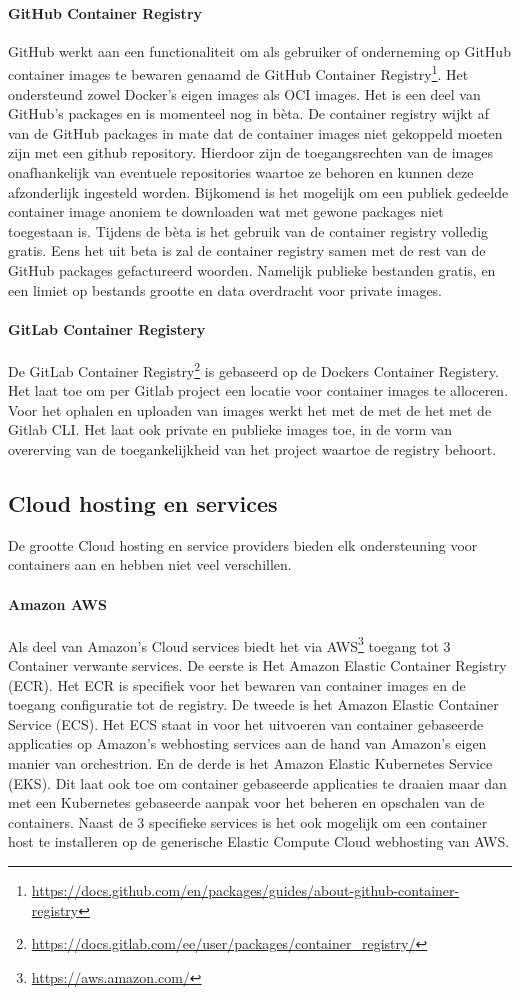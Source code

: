 \paragraph{GitHub Container Registry}
GitHub werkt aan een functionaliteit om als gebruiker of onderneming op GitHub container images te bewaren genaamd de  GitHub Container Registry\footnote{\url{https://docs.github.com/en/packages/guides/about-github-container-registry}}. Het ondersteund zowel Docker’s eigen images als OCI images. Het is een deel van GitHub’s packages en is momenteel nog in bèta. De container registry wijkt af van de GitHub packages in mate dat de container images niet gekoppeld moeten zijn met een github repository. Hierdoor zijn de toegangsrechten van de images onafhankelijk van eventuele repositories waartoe ze behoren en kunnen deze afzonderlijk ingesteld worden. Bijkomend is het mogelijk om een publiek gedeelde container image anoniem te downloaden wat met gewone packages niet toegestaan is. Tijdens de bèta is het gebruik van de container registry volledig gratis. Eens het uit beta is zal de container registry samen met de rest van de GitHub packages gefactureerd woorden. Namelijk publieke bestanden gratis, en een limiet op bestands grootte en data overdracht voor private images.
\paragraph{GitLab Container Registery}
De GitLab Container Registry\footnote{\url{https://docs.gitlab.com/ee/user/packages/container_registry/}} is gebaseerd op de Dockers Container Registery. Het laat toe om per Gitlab project een locatie voor container images te alloceren. Voor het ophalen en uploaden van images werkt het met de met de het met de Gitlab CLI. Het laat ook private en publieke images toe, in de vorm van overerving van de toegankelijkheid van het project waartoe de registry behoort. 


\subsection{Cloud hosting en services}
De grootte Cloud hosting en service providers bieden elk ondersteuning voor containers aan en hebben niet veel verschillen.
\paragraph{Amazon AWS}
Als deel van Amazon’s Cloud services biedt het via AWS\footnote{\url{https://aws.amazon.com/}} toegang tot 3 Container verwante services. De eerste is Het Amazon Elastic Container Registry (ECR). Het ECR is specifiek voor het bewaren van container images en de toegang configuratie tot de registry. De tweede is het Amazon Elastic Container Service (ECS). Het ECS staat in voor het uitvoeren van container gebaseerde applicaties op Amazon’s webhosting services aan de hand van Amazon’s eigen manier van orchestrion. En de derde is het Amazon Elastic Kubernetes Service (EKS). Dit laat ook toe om container gebaseerde applicaties te draaien maar dan met een Kubernetes gebaseerde aanpak voor het beheren en opschalen van de containers. Naast de 3 specifieke services is het ook mogelijk om een container host te installeren op de generische Elastic Compute Cloud webhosting van AWS.
